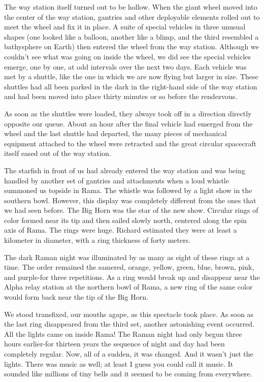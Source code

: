 \documentclass[]{article}
\begin{document}
{The way station itself turned out to be hollow.  When the giant wheel moved into the center of the way station, gantries and other deployable elements rolled out to meet the wheel and fix it in place.  A suite of special vehicles in three unusual shapes (one looked like a balloon, another like a blimp, and the third resembled a bathysphere on Earth) then entered the wheel from the way station.  Although we couldn’t see what was going on inside the wheel, we did see the special vehicles emerge, one by one, at odd intervals over the next two days.  Each vehicle was met by a shuttle, like the one in which we are now flying but larger in size.  These shuttles had all been parked in the dark in the right-hand side of the way station and had been moved into place thirty minutes or so before the rendezvous.

As soon as the shuttles were loaded, they always took off in a direction directly opposite our queue.  About an hour after the final vehicle had emerged from the wheel and the last shuttle had departed, the many pieces of mechanical equipment attached to the wheel were retracted and the great circular spacecraft itself eased out of the way station.

The starfish in front of us had already entered the way station and was being handled by another set of gantries and attachments when a loud whistle summoned us topside in Rama.  The whistle was followed by a light show in the southern bowl.  However, this display was completely different from the ones that we had seen before.  The Big Horn was the star of the new show.  Circular rings of color formed near its tip and then sailed slowly north, centered along the spin axis of Rama.  The rings were huge.  Richard estimated they were at least a kilometer in diameter, with a ring thickness of forty meters.

The dark Raman night was illuminated by as many as eight of these rings at a time.  The order remained the samered, orange, yellow, green, blue, brown, pink, and purple-for three repetitions.  As a ring would break up and disappear near the Alpha relay station at the northern bowl of Rama, a new ring of the same color would form back near the tip of the Big Horn.

We stood transfixed, our mouths agape, as this spectacle took place.  As soon as the last ring disappeared from the third set, another astonishing event occurred.  All the lights came on inside Rama! The Raman night had only begun three hours earlier-for thirteen years the sequence of night and day had been completely regular.  Now, all of a sudden, it was changed.  And it wasn’t just the lights.  There was music as well; at least I guess you could call it music.  It sounded like millions of tiny bells and it seemed to be coming from everywhere.

}
\end{document}
